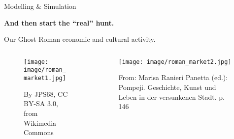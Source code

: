 \documentclass[10pt, notes=show]{beamer}
\begin{document}
\begin{frame}{Modelling \& Simulation}
    \begin{figure}
        \hfill
    \end{figure}
\end{frame}

\begin{frame}
    \bf \huge
    And then start the ``real'' hunt.
\end{frame}
\begin{frame}{Our Ghost}
    Roman economic and cultural activity.
    \begin{columns}

        \begin{column}{0.45\linewidth}
            \begin{figure}
                \texttt{[image: image/roman\_market1.jpg]}\\
                \parbox{.90\textwidth}{\tiny By JPS68, CC BY-SA 3.0, from Wikimedia Commons}
            \end{figure}
        \end{column}
        \begin{column}{0.45\linewidth}

            \begin{figure}
                \texttt{[image: image/roman\_market2.jpg]}\\
                \parbox{.85\textwidth}{\tiny From: Marisa Ranieri Panetta (ed.): Pompeji. Geschichte, Kunst und Leben in der versunkenen Stadt. p. 146}
            \end{figure}
        \end{column}

    \end{columns}

    \begin{figure}
    \end{figure}
\end{frame}
\end{document}
